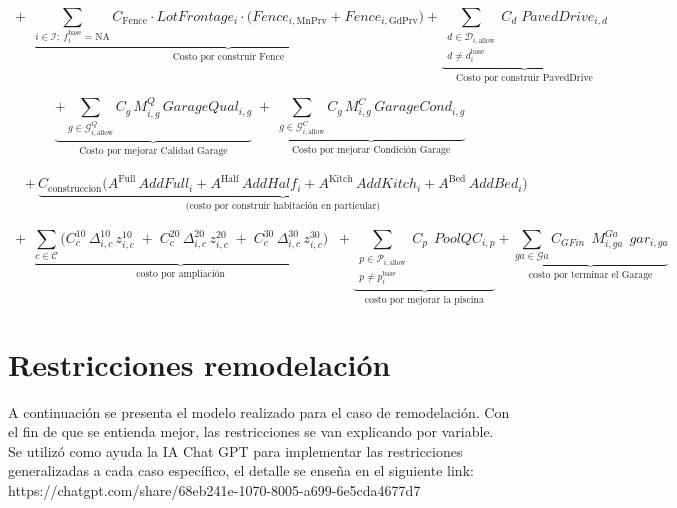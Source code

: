 \[
  \;+\;
   \underbrace{\sum_{i \in \mathcal{I}: \ f_i^{\text{base}}=\text{NA}}
  C_{\text{Fence}} \cdot LotFrontage_i \cdot 
  \Big( Fence_{i,\text{MnPrv}} + Fence_{i,\text{GdPrv}} \Big)}_{\text{Costo por construir Fence}}
+\underbrace{\sum_{\substack{d \in \mathcal{D}_{i,\text{allow}} \\ d \neq d_i^{\text{base}}}}
C_d \; PavedDrive_{i,d}}_{\text{Costo por construir PavedDrive}}
\]

\[
\underbrace{+\sum_{g\in \mathcal{G}^{Q}_{i,\text{allow}}}
C_g\, M^{Q}_{i,g}\, GarageQual_{i,g}}_{\text{Costo por mejorar Calidad Garage}}
\;+\;
\underbrace{\sum_{g\in \mathcal{G}^{C}_{i,\text{allow}}}
C_g\, M^{C}_{i,g}\, GarageCond_{i,g}}_{\text{Costo por mejorar Condición Garage}}
\]


\[
\begin{aligned}
&+\,
\underbrace{
C_{\text{construccion}}
\Big(
A^{\text{Full}}\,AddFull_i
+ A^{\text{Half}}\,AddHalf_i
+ A^{\text{Kitch}}\,AddKitch_i
+ A^{\text{Bed}}\,AddBed_i
\Big)
}_{\text{(costo por construir habitación en particular)}}
\end{aligned}
\]


\[
 \;+\;\underbrace{ \sum_{c\in\mathcal{C}}
\Big( C^{10}_{c}\,\Delta^{10}_{i,c}\, z^{10}_{i,c} \;+\; C^{20}_{c}\,\Delta^{20}_{i,c}\, z^{20}_{i,c} \;+\; C^{30}_{c}\,\Delta^{30}_{i,c}\, z^{30}_{i,c} \Big)}_{\text{costo por ampliación}}
\;\;
+\underbrace{\sum_{\substack{p \in \mathcal{P}_{i,\text{allow}} \\ p \neq p_i^{\text{base}}}}
C_p \;\, PoolQC_{i,p}}_{\text{costo por mejorar la piscina}}
+\underbrace{\sum_{ga \in \mathcal{G}a}
C_{GFin} \;\, M^{Ga}_{i,ga} \;\, gar_{i,ga}}_{\text{costo por terminar el Garage}}
\]

\section{Restricciones remodelación}
\label{sec:restricciones remodelación}
A continuación se presenta el modelo realizado para el caso de remodelación. Con el fin de que se entienda mejor, las restricciones se van explicando por variable. Se utilizó como ayuda la IA Chat GPT para implementar las restricciones generalizadas a cada caso específico, el detalle se enseña en el siguiente link: https://chatgpt.com/share/68eb241e-1070-8005-a699-6e5cda4677d7

